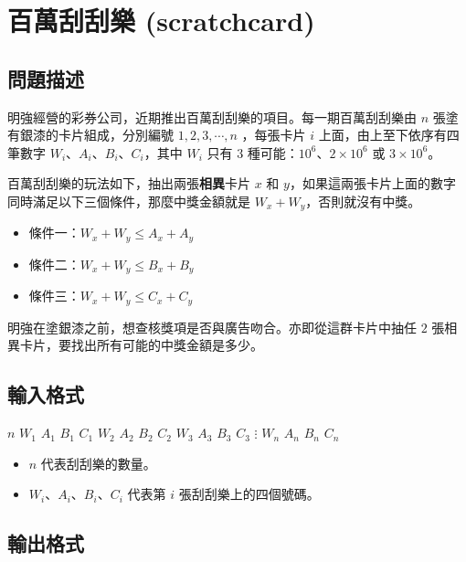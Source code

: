\section{百萬刮刮樂 (scratchcard)}

\subsection{問題描述}

明強經營的彩券公司，近期推出百萬刮刮樂的項目。每一期百萬刮刮樂由 \(n\)
張塗有銀漆的卡片組成，分別編號 \(1, 2, 3, \cdots, n\) ，每張卡片 \(i\)
上面，由上至下依序有四筆數字 \(W_i\)、\(A_i\)、\(B_i\)、\(C_i\)，其中
\(W_i\) 只有 \(3\) 種可能：\(10^6\)、\(2\times 10^6\) 或
\(3\times 10^6\)。

百萬刮刮樂的玩法如下，抽出兩張\textbf{相異}卡片 \(x\) 和
\(y\)，如果這兩張卡片上面的數字同時滿足以下三個條件，那麼中獎金額就是
\(W_x + W_y\)，否則就沒有中獎。

\begin{itemize}
\tightlist
\item
  條件一：\(W_x + W_y \le A_x + A_y\)
\item
  條件二：\(W_x + W_y \le B_x + B_y\)
\item
  條件三：\(W_x + W_y \le C_x + C_y\)
\end{itemize}

明強在塗銀漆之前，想查核獎項是否與廣告吻合。亦即從這群卡片中抽任 \(2\)
張相異卡片，要找出所有可能的中獎金額是多少。

\subsection{輸入格式}

\begin{format}
\f{
$n$
$W_1$ $A_1$ $B_1$ $C_1$
$W_2$ $A_2$ $B_2$ $C_2$
$W_3$ $A_3$ $B_3$ $C_3$
$\vdots$
$W_n$ $A_n$ $B_n$ $C_n$
}
\end{format}

\begin{itemize}
\tightlist
\item
  \(n\) 代表刮刮樂的數量。
\item
  \(W_i\)、\(A_i\)、\(B_i\)、\(C_i\) 代表第 \(i\) 張刮刮樂上的四個號碼。
\end{itemize}

\subsection{輸出格式}

